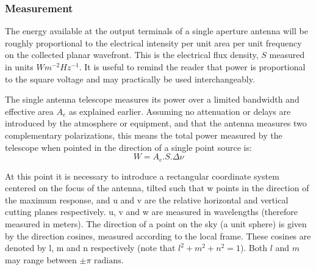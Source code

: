 \documentclass[a4paper,10pt]{report}
\begin{document}
\subsubsection{Measurement}
The energy available at the output terminals of a single aperture antenna will be roughly proportional to the electrical intensity per unit area per unit frequency on the 
collected planar wavefront. This is the electrical flux density, $S$ measured in units $Wm^{-2}Hz^{-1}$. It is useful to remind the reader that power is proportional to the square voltage and may 
practically be used interchangeably.

The single antenna telescope measures its power over a limited bandwidth and effective area $A_e$ as explained earlier. Assuming
no attenuation or delays are introduced by the atmosphere or equipment, and that the antenna measures two complementary polarizations, this 
means the total power measured by the telescope when pointed in the direction of a single point source is: 
\begin{equation*}
W = A_e.S.\Delta\nu
\end{equation*}

At this point it is necessary to introduce a rectangular coordinate system centered on the focus of the antenna, tilted such that w points 
in the direction of the maximum response, and u and v are the relative horizontal and vertical cutting planes respectively. u, v and w are 
measured in wavelengths (therefore measured in meters). The direction of a point on the sky (a unit sphere) is given by the 
direction cosines, measured according to the local frame. These cosines are denoted by l, m and n respectively (note that $l^2 + m^2 + n^2 = 1$). 
Both $l$ and $m$ may range between $\pm\pi \text{ radians}$.
\end{document}
